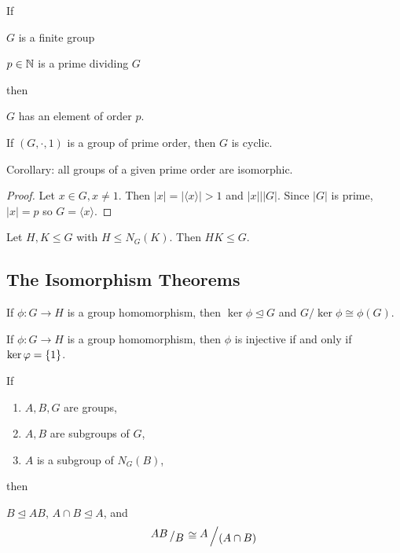 \documentclass[a5paper]{article}
\begin{document}
\begin{theorem}
  If
  \begin{premises}
    \item $G$ is a finite group
    \item $p\in\mathbb{N}$ is a prime dividing $G$
  \end{premises}
  then
  \begin{conclusion}
    $G$ has an element of order $p$.
  \end{conclusion}
\end{theorem}

\begin{theorem}
	If $(G,\cdot,1)$ is a group of prime order, then $G$ is cyclic.

  Corollary: all groups of a given prime order are isomorphic.
\end{theorem}
\begin{proof}
  Let $x\in G,x\neq 1$. Then $|x|=|\langle x \rangle |>1$ and $|x|\big||G|$.
  Since $|G|$ is prime, $|x|=p$ so $G=\langle x \rangle$.
\end{proof}

\begin{lemma}
	Let $H,K\leqslant G$ with $H\leqslant N_G(K)$. Then $HK\leqslant G$.
\end{lemma}

\subsection{The Isomorphism Theorems}

\begin{theorem}
	If $\phi:G\to H$ is a group homomorphism, then $\ker\phi\trianglelefteq G$ and
  $G/\ker\phi\cong\phi(G)$. 
\end{theorem}

\begin{corollary}
	If $\phi:G\to H$ is a group homomorphism, then $\phi$ is injective if and only
  if $\ker\varphi=\left\{1\right\}$.
\end{corollary}

\begin{theorem}
  If
  \begin{enumerate}%
    \item $A,B,G$ are groups,
    \item $A,B$ are subgroups of $G$,
    \item $A$ is a subgroup of $N_G(B)$,
  \end{enumerate}
  then
  \begin{conclusion}
    $B\trianglelefteq AB$, $A\cap B\trianglelefteq A$, and
    \begin{equation*}
      \quotient{AB}{B}\cong \quotient{A}{(A\cap B)}
    \end{equation*}
  \end{conclusion}
\end{theorem}
\end{document}
